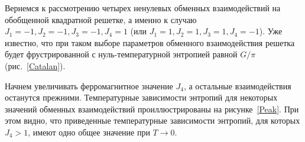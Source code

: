 \documentclass[utf8,12pt]{jetp}
\begin{document}
Вернемся к рассмотрению четырех ненулевых обменных взаимодействий на обобщенной квадратной решетке, а именно к случаю $J_1 = -1, J_2 = -1, J_3 = -1, J_4 = 1$ (или $J_1 = 1, J_2 = 1, J_3 = 1, J_4 = -1$). Уже известно, что при таком выборе параметров обменного взаимодействия решетка будет фрустрированной с нуль-температурной энтропией равной $G/\pi$ (рис.~\ref{Catalan}). 

Начнем увеличивать ферромагнитное значение $J_4$, а остальные взаимодействия останутся прежними. Температурные зависимости энтропий для некоторых значений обменных взаимодействий проиллюстрированы на рисунке~\ref{Peak}. При этом видно, что приведенные температурные зависимости энтропий, для которых $J_4>1$, имеют одно общее значение при $T \rightarrow 0$. 

\begin{figure}[h]
	\begin{minipage}[h]{0.5\linewidth}
	\end{minipage}
	\hfill
	\begin{minipage}[h]{0.5\linewidth}

\end{minipage}
\end{figure}
\end{document}
